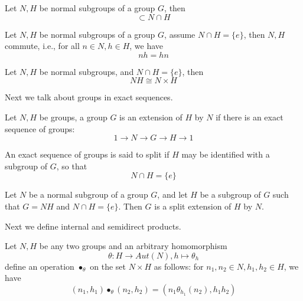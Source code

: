 \documentclass[openany]{book}
\begin{document}
\begin{lem}
    Let $N,H$ be normal subgroups of a group $G$, then 
    \begin{equation*}
        [N,H]\subset N\cap H
    \end{equation*}
\end{lem}
\begin{cor}
    Let $N,H$ be normal subgroups of a group $G$, assume $N\cap H=\{e\}$, then $N,H$ commute, i.e., for all $n\in N, h\in H$, we have 
    \begin{equation*}
        nh=hn
    \end{equation*}
\end{cor}
\begin{prop}
    Let $N,H$ be normal subgroups, and $N\cap H=\{e\}$, then 
    \begin{equation*}
        NH\cong N\times H
    \end{equation*}
\end{prop}
Next we talk about groups in exact sequences.
\begin{defn}[extension]
    Let $N,H$ be groups, a group $G$ is an extension of $H$ by $N$ if there is an exact sequence of groups:
    \begin{equation*}
        1\to N\to G\to H\to 1
    \end{equation*}
\end{defn}
\begin{defn}[split]
    An exact sequence of groups is said to split if $H$ may be identified with a subgroup of $G$, so that 
    \begin{equation*}
        N\cap H=\{e\}
    \end{equation*}
\end{defn}
\begin{lem}
    Let $N$ be a normal subgroup of a group $G$, and let $H$ be a subgroup of $G$ such that $G=NH$ and $N\cap H=\{e\}$. Then $G$ is a split extension of $H$ by $N$.
\end{lem}
Next we define internal and semidirect products.
\begin{defn}
    Let $N,H$ be any two groups and an arbitrary homomorphism
    \begin{equation*}
        \theta:H\to Aut(N), h\mapsto\theta_h
    \end{equation*}
    define an operation $\bullet_\theta$ on the set $N\times H$ as follows: for $n_1, n_2\in N, h_1,h_2\in H$, we have 
    \begin{equation*}
        (n_1,h_1)\bullet_\theta(n_2,h_2)=(n_1\theta_{h_1}(n_2), h_1h_2)
    \end{equation*}
\end{defn}
\end{document}

